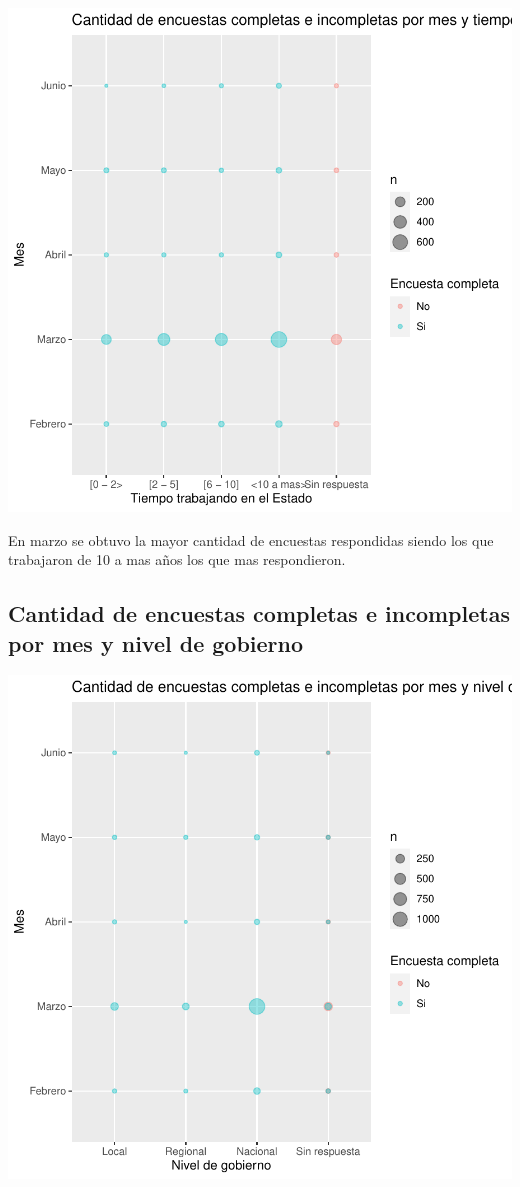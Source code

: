 \documentclass{article}
\begin{document}
\includegraphics{seguimientov3-027}

En marzo se obtuvo la mayor cantidad de encuestas respondidas siendo los que trabajaron de 10 a mas años los que mas respondieron.

\subsection{Cantidad de encuestas completas e incompletas por mes y nivel de gobierno}

\includegraphics{seguimientov3-028}
\end{document}
